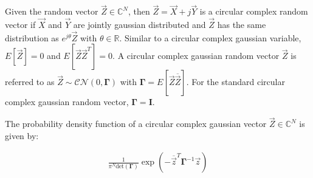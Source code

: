 \documentclass[a4paper, openany, oneside]{memoir}
\begin{document}
\begin{blockDefinition}
Given the random vector $\vec{Z} \in \mathbb{C}^N$, then $\vec{Z} = \vec{X} + j\vec{Y}$ is a circular complex random vector if $\vec{X}$ and $\vec{Y}$ are jointly gaussian distributed and $\vec{Z}$ has the same distribution as $e^{j\theta}\vec{Z}$ with $\theta \in \mathbb{R}$. Similar to a circular complex gaussian variable, $E\left[\vec{Z}\right] = 0$
and $E\left[\vec{Z}\vec{Z}^T\right] = 0$. A circular complex gaussian random vector $\vec{Z}$ is referred to as $\vec{Z} \sim \mathcal{CN}(0,\mathbf{\Gamma})$ with $\mathbf{\Gamma} = E\left[\vec{Z}\overline{\vec{Z}} \right]$. For the standard circular complex gaussian random vector, $\mathbf{\Gamma} = \mathbf{I}$. 

The probability density function of a circular complex gaussian vector $\vec{Z}\in \mathbb{C}^N$ is given by:

\begin{align*}
	\frac{1}{\pi^N \text{det}(\mathbf{\Gamma})} \exp \left(-\overline{\vec{z}}^T \mathbf{\Gamma}^{-1}\vec{z}\right)
\end{align*}
\end{blockDefinition}






\end{document}
